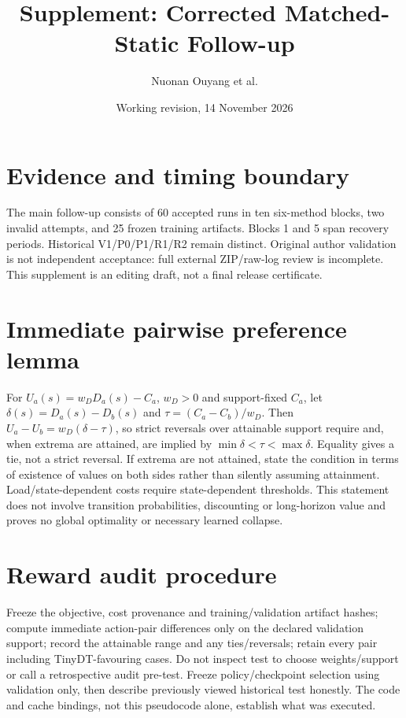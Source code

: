 \documentclass[10pt,a4paper]{article}
\begin{document}
\title{Supplement: Corrected Matched-Static Follow-up}
\author{Nuonan Ouyang et al.}\date{Working revision, 14 November 2026}\maketitle
\section{Evidence and timing boundary}
The main follow-up consists of 60 accepted runs in ten six-method blocks, two invalid attempts, and 25 frozen training artifacts. Blocks 1 and 5 span recovery periods. Historical V1/P0/P1/R1/R2 remain distinct. Original author validation is not independent acceptance: full external ZIP/raw-log review is incomplete. This supplement is an editing draft, not a final release certificate.

\section{Immediate pairwise preference lemma}
For $U_a(s)=w_DD_a(s)-C_a$, $w_D>0$ and support-fixed $C_a$, let $\delta(s)=D_a(s)-D_b(s)$ and $\tau=(C_a-C_b)/w_D$. Then $U_a-U_b=w_D(\delta-\tau)$, so strict reversals over attainable support require and, when extrema are attained, are implied by $\min\delta<\tau<\max\delta$. Equality gives a tie, not a strict reversal. If extrema are not attained, state the condition in terms of existence of values on both sides rather than silently assuming attainment. Load/state-dependent costs require state-dependent thresholds. This statement does not involve transition probabilities, discounting or long-horizon value and proves no global optimality or necessary learned collapse.

\section{Reward audit procedure}
Freeze the objective, cost provenance and training/validation artifact hashes; compute immediate action-pair differences only on the declared validation support; record the attainable range and any ties/reversals; retain every pair including TinyDT-favouring cases. Do not inspect test to choose weights/support or call a retrospective audit pre-test. Freeze policy/checkpoint selection using validation only, then describe previously viewed historical test honestly. The code and cache bindings, not this pseudocode alone, establish what was executed.
\end{document}
